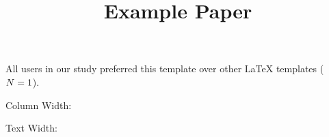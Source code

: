 \documentclass[sigconf,nonacm]{acmart}
\title{Example Paper}
\providecommand{\paperroot}{.}
\begin{document}


\maketitle

All users in our study preferred this template over other \LaTeX{} templates ($N = 1$).

\newpage

Column Width: \the\columnwidth

Text Width: \the\textwidth


	
	
\end{document}
